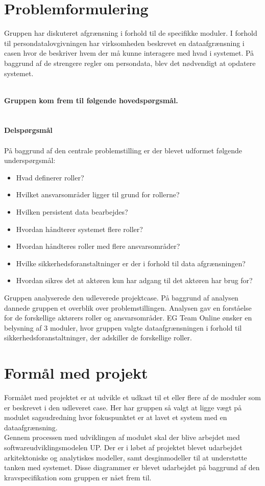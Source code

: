 \section{Problemformulering}
Gruppen har diskuteret afgrænsning i forhold til de specifikke moduler. I forhold til persondatalovgivningen har virksomheden beskrevet en dataafgrænsning i casen hvor de beskriver hvem der må kunne interagere med hvad i systemet. På baggrund af de strengere regler om persondata, blev det nødvendigt at opdatere systemet.

\textbf{\\Gruppen kom frem til følgende hovedspørgsmål.}\\ \\
\noindent{}
 \textbf{\\Delspørgsmål\\}\\
På baggrund af den centrale problemstilling er der blevet udformet følgende underspørgsmål:\\ 
\begin{itemize}
\item Hvad definerer roller?
\item Hvilket ansvarsområder ligger til grund for rollerne?
\item Hvilken persistent data bearbejdes?
\item Hvordan håndterer systemet flere roller?
\item Hvordan håndteres roller med flere ansvarsområder?
\item Hvilke sikkerhedsforanstaltninger er der i forhold til data afgrænsningen?
\item Hvordan sikres det at aktøren kun har adgang til det aktøren har brug for? 
\end{itemize}
Gruppen analyserede den udleverede projektcase. På baggrund af analysen dannede gruppen et overblik over problemstillingen. Analysen gav en forståelse for de forskellige aktørers roller og ansvarsområder. EG Team Online ønsker en belysning af 3 moduler, hvor gruppen valgte dataafgrænsningen i forhold til sikkerhedsforanstaltninger, der adskiller de forskellige roller.
\newpage
\section{Formål med projekt}
Formålet med projektet er at udvikle et udkast til et eller flere af de moduler som er beskrevet i den udleveret case. 
Her har gruppen så valgt at ligge vægt på modulet sagsudredning hvor fokuspunktet er at lavet et system med en dataafgrænsning.\\
Gennem processen med udviklingen af modulet skal der blive arbejdet med softwareudviklingsmodelen UP. Der er i løbet af projektet blevet udarbejdet arkitektoniske og analytiskes modeller, samt desginmodeller til at understøtte tanken med systemet. Disse diagrammer er blevet udarbejdet på baggrund af den kravspecifikation som gruppen er nået frem til. 
